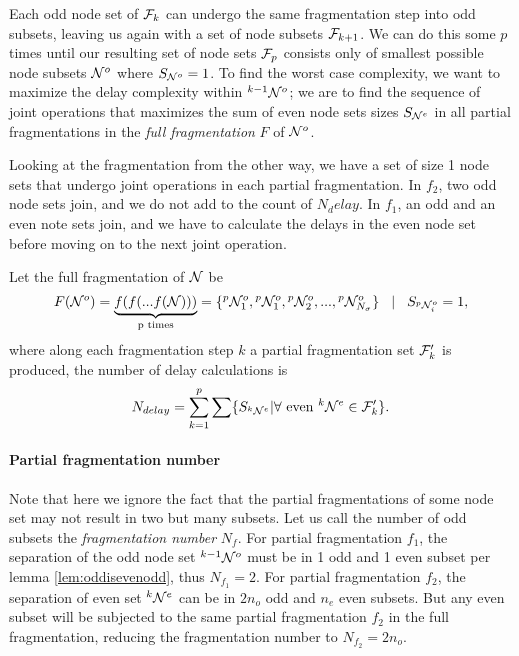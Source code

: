 Each odd node set of $\mathcal{F}_k$ can undergo the same fragmentation step into odd subsets, leaving us again with a set of node subsets $\mathcal{F}_{k+1}$. We can do this some $p$ times until our resulting set of node sets $\mathcal{F}_{p}$ consists only of smallest possible node subsets $\mathcal{N}^o$ where $S_{\mathcal{N}^o}=1$. To find the worst case complexity, we want to maximize the delay complexity within ${}^{k-1}\mathcal{N}^o$; we are to find the sequence of joint operations that maximizes the sum of even node sets sizes $S_{\mathcal{N}^e}$ in all partial fragmentations in the \emph{full fragmentation} $F$ of $\mathcal{N}^o$.

Looking at the fragmentation from the other way, we have a set of size 1 node sets that undergo joint operations in each partial fragmentation. In $f_2$, two odd node sets join, and we do not add to the count of $N_delay$. In $f_1$, an odd and an even note sets join, and we have to calculate the delays in the even node set before moving on to the next joint operation.

\begin{lemma}
  Let the full fragmentation of $\mathcal{N}$ be
  \begin{equation}\label{eq:fullfrag}
    F(\mathcal{N}^o) = \underbrace{f(f(...f(\mathcal{N})))}_\text{p times} = \{{}^{p}\mathcal{N}^{o}_1, {}^{p}\mathcal{N}^{o}_1, {}^{p}\mathcal{N}^{o}_2, ... ,{}^{p}\mathcal{N}^{o}_{N_\sigma} \} \hspace{.3cm} | \hspace{.3cm} S_{{}^{p}\mathcal{N}^{o}_i} = 1,
  \end{equation}
  where along each fragmentation step $k$ a partial fragmentation set $\mathcal{F}'_k$ is produced, the number of delay calculations is
  \begin{equation}\label{eq:maxdelay}
    N_{delay} = \sum_{k=1}^{p} \sum \{ S_{{}^{k}\mathcal{N}^e} | \forall \mbox{ even } {}^{k}\mathcal{N}^e \in \mathcal{F}'_k \}.
  \end{equation}
\end{lemma}

\paragraph{Partial fragmentation number}
Note that here we ignore the fact that the partial fragmentations of some node set may not result in two but many subsets. Let us call the number of odd subsets the \emph{fragmentation number} $N_f$. For partial fragmentation $f_1$, the separation of the odd node set ${}^{k-1}\mathcal{N}^o$ must be in 1 odd and 1 even subset per lemma \ref{lem:oddisevenodd}, thus $N_{f_1} = 2$. For partial fragmentation $f_2$, the separation of even set ${}^{k}\mathcal{N}^e$ can be in $2n_o$ odd and $n_e$ even subsets. But any even subset will be subjected to the same partial fragmentation $f_2$ in the full fragmentation, reducing the fragmentation number to $N_{f_2} = 2n_o$.

